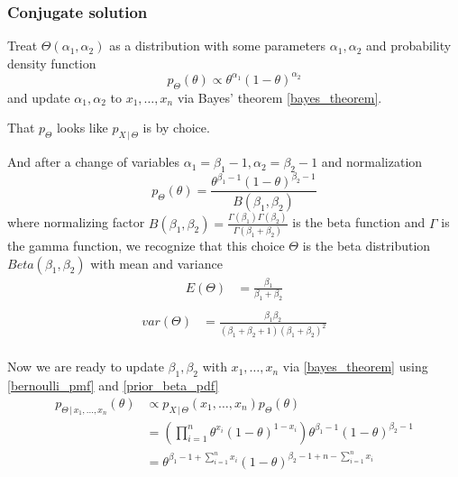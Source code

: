 \documentclass[14pt, reqno]{amsart}
\theoremstyle{definition}
\begin{document}
\subsubsection{Conjugate solution} Treat $\Theta(\alpha_1, \alpha_2)$ as a distribution with some parameters $\alpha_1, \alpha_2$ and probability density function
$$p_{\Theta}(\theta) \propto \theta^{\alpha_1}(1 - \theta)^{\alpha_2}$$
and update $\alpha_1, \alpha_2$ to $x_1, \dots, x_n$ via Bayes' theorem \ref{bayes_theorem}.

That $p_{\Theta}$ looks like $p_{X \,|\, \Theta}$ is by choice.

And after a change of variables $\alpha_1 = \beta_1 - 1, \alpha_2 = \beta_2 - 1$ and normalization
\begin{equation}\label{prior_beta_pdf}
p_{\Theta}(\theta) = \frac{\theta^{\beta_1 - 1} (1 - \theta)^{\beta_2 - 1}}{B(\beta_1, \beta_2)}
\end{equation}
where normalizing factor $B(\beta_1, \beta_2) = \frac{\Gamma(\beta_1) \Gamma(\beta_2)}{\Gamma(\beta_1 + \beta_2)}$ is the beta function and $\Gamma$ is the gamma function, we recognize that this choice $\Theta$ is the beta distribution $Beta(\beta_1, \beta_2)$ with mean and variance
\begin{align*}
E(\Theta) & = \frac{\beta_1}{\beta_1 + \beta_2} \\
\end{align*}
\begin{align*}
var(\Theta) & = \frac{\beta_1 \beta_2}{(\beta_1 + \beta_2 + 1)(\beta_1 + \beta_2)^2} \\
\end{align*}

Now we are ready to update $\beta_1, \beta_2$ with $x_1, \dots, x_n$ via \eqref{bayes_theorem} using \eqref{bernoulli_pmf} and \eqref{prior_beta_pdf}
\begin{align*}
p_{\Theta \,|\, x_1, \dots, x_n}(\theta) & \propto p_{X \,|\, \Theta}(x_1, \dots, x_n) p_{\Theta}(\theta)  \\
 & = \left( \prod \limits _{i=1}^n \theta^{x_i} (1 - \theta)^{1 - x_i} \right) \theta^{\beta_1 - 1} (1 - \theta)^{\beta_2 - 1} \\
 & = \theta^{\beta_1 - 1 + \sum \limits _{i=1}^n x_i} (1 - \theta)^{\beta_2 - 1 + n - \sum \limits _{i=1}^n x_i} \\
\end{align*}
\end{document}
